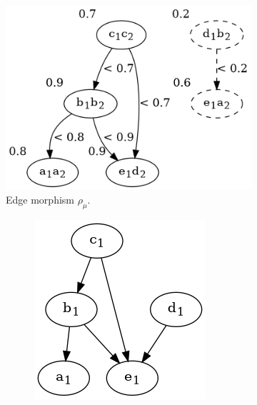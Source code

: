 \begin{frame}
\begin{figure}[htbp]
		\quad
		\begin{subfigure}[t]{0.40\textwidth}
			\centering
			\includegraphics[width=\linewidth,valign=t]{inc/fuzzy_graph_theory/fuzzy_graph_morphism_internal_rho_mu.png}
			\caption{Edge morphism $\rho_{\mu}$.}
		\end{subfigure}
		\quad
		\begin{subfigure}[t]{0.18\textwidth}
			\begin{subfigure}[t]{\textwidth}
				\centering
				\includegraphics[width=\linewidth,valign=t]{inc/fuzzy_graph_theory/fuzzy_graph_morphism_G1.png}

\end{subfigure}
\end{subfigure}
\end{figure}
\end{frame}
